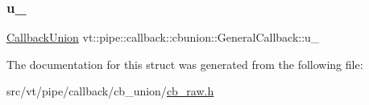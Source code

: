 \subsubsection{\texorpdfstring{u\+\_\+}{u\_}}
{\footnotesize\ttfamily \hyperlink{unionvt_1_1pipe_1_1callback_1_1cbunion_1_1_callback_union}{Callback\+Union} vt\+::pipe\+::callback\+::cbunion\+::\+General\+Callback\+::u\+\_\+}



The documentation for this struct was generated from the following file\+:\begin{DoxyCompactItemize}
\item 
src/vt/pipe/callback/cb\+\_\+union/\hyperlink{cb__raw_8h}{cb\+\_\+raw.\+h}\end{DoxyCompactItemize}

